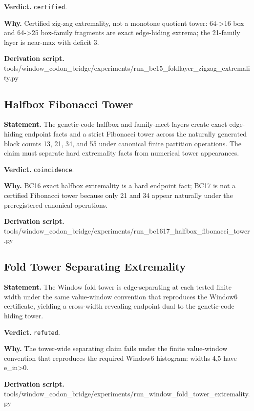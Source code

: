 \textbf{Verdict.} \texttt{certified}.

\textbf{Why.} Certified zig-zag extremality, not a monotone quotient tower: 64->16 box and 64->25 box-family
fragments are exact edge-hiding extrema; the 21-family layer is near-max with deficit 3.

\textbf{Derivation script.} tools/window\_codon\_bridge/experiments/run\_bc15\_foldlayer\_zigzag\_extremality.py

\subsection{Halfbox Fibonacci Tower}\label{sec:bridge-halfbox-fibonacci-tower}
\textbf{Statement.} The genetic-code halfbox and family-meet layers create exact edge-hiding endpoint facts and a strict
Fibonacci tower across the naturally generated block counts 13, 21, 34, and 55 under canonical
finite partition operations. The claim must separate hard extremality facts from numerical tower
appearances.

\textbf{Verdict.} \texttt{coincidence}.

\textbf{Why.} BC16 exact halfbox extremality is a hard endpoint fact; BC17 is not a certified Fibonacci tower
because only 21 and 34 appear naturally under the preregistered canonical operations.

\textbf{Derivation script.} tools/window\_codon\_bridge/experiments/run\_bc1617\_halfbox\_fibonacci\_tower.py

\subsection{Fold Tower Separating Extremality}\label{sec:bridge-fold-tower-separating-extremality}
\textbf{Statement.} The Window fold tower is edge-separating at each tested finite width under the same value-window
convention that reproduces the Window6 certificate, yielding a cross-width revealing endpoint dual
to the genetic-code hiding tower.

\textbf{Verdict.} \texttt{refuted}.

\textbf{Why.} The tower-wide separating claim fails under the finite value-window convention that reproduces the
required Window6 histogram: widths 4,5 have e\_in>0.

\textbf{Derivation script.} tools/window\_codon\_bridge/experiments/run\_window\_fold\_tower\_extremality.py

